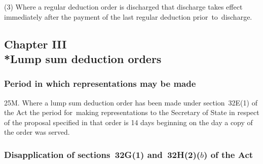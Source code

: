 \documentclass[12pt,a4paper]{article}
\begin{document}
(3) Where a regular deduction order is discharged that discharge takes effect immediately after the payment of the last regular deduction prior~to~discharge.


\subsection[Chapter III --- Lump sum deduction orders]{Chapter III\\*Lump sum deduction orders}

\renewcommand\parthead{--- Part IIIA Chapter III}

\subsubsection[25M. Period in which representations may be made]{Period in which representations may be made}

25M.  Where a lump sum deduction order has been made under section~32E(1) of the Act the period for~making representations to the 
Secretary of State  %
in respect of the proposal specified in that order is 14 days beginning on the day a copy of the order was served.


\subsubsection[25N. Disapplication of sections~32G(1) and~32H(2)($b$)  of the Act]{Disapplication of sections~32G(1) and~32H(2)($b$)  of the Act}
\end{document}
